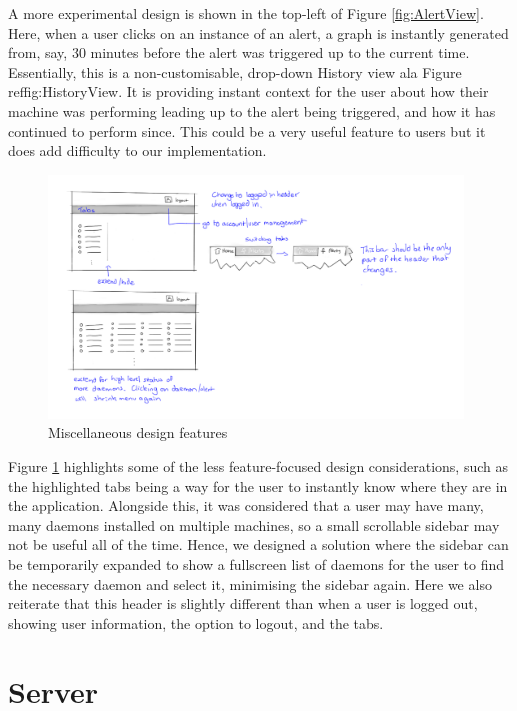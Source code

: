 \documentclass{l3proj}
\begin{document}
A more experimental design is shown in the top-left of Figure \ref{fig:AlertView}. Here, when a user clicks on an instance of an alert, a graph is instantly generated from, say, 30 minutes before the alert was triggered up to the current time. Essentially, this is a non-customisable, drop-down History view ala Figure ref{fig:HistoryView}. It is providing instant context for the user about how their machine was performing leading up to the alert being triggered, and how it has continued to perform since. This could be a very useful feature to users but it does add difficulty to our implementation.

\begin{figure}[H]
\centering
\includegraphics[width=110mm]{Concept_Designs/Misc.png}
\caption{Miscellaneous design features}
\label{fig:MiscDesign}
\end{figure}

Figure \ref{fig:MiscDesign} highlights some of the less feature-focused design considerations, such as the highlighted tabs being a way for the user to instantly know where they are in the application. Alongside this, it was considered that a user may have many, many daemons installed on multiple machines, so a small scrollable sidebar may not be useful all of the time. Hence, we designed a solution where the sidebar can be temporarily expanded to show a fullscreen list of daemons for the user to find the necessary daemon and select it, minimising the sidebar again. Here we also reiterate that this header is slightly different than when a user is logged out, showing user information, the option to logout, and the tabs.


\section{Server}
\end{document}
